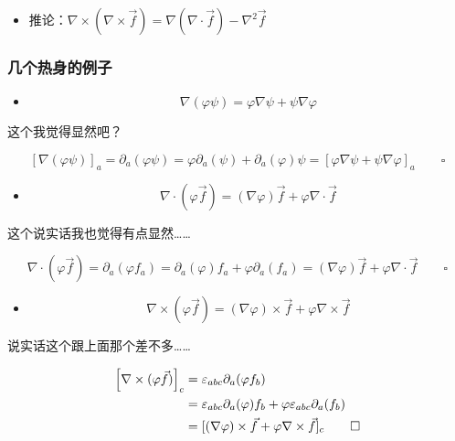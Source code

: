 \documentclass{article}
\begin{document}
\begin{itemize}
    \item 推论：$\nabla\times(\nabla\times\vec{f})=\nabla(\nabla\cdot\vec{f})-\nabla^2\vec{f}$
\end{itemize}

\subsubsection{几个热身的例子}

\begin{itemize}
    \item $$\nabla(\varphi\psi)=\varphi\nabla\psi+\psi\nabla\varphi$$
\end{itemize}

这个我觉得显然吧？

$$[\nabla(\varphi\psi)]_{a}=\partial_{a}(\varphi\psi)=\varphi\partial_{a}(\psi)+\partial_{a}(\varphi)\psi=[\varphi\nabla\psi+\psi\nabla\varphi]_{a}\qquad\square$$

\begin{itemize}
    \item $$\nabla\cdot(\varphi\vec{f})=(\nabla\varphi)\vec{f}+\varphi\nabla\cdot\vec{f}$$
\end{itemize}

这个说实话我也觉得有点显然……

$$\nabla\cdot(\varphi\vec{f})=\partial_{a}(\varphi f_{a})=\partial_{a}(\varphi)f_{a}+\varphi\partial_{a}(f_{a})=(\nabla\varphi)\vec{f}+\varphi\nabla\cdot\vec{f}\qquad\square$$

\begin{itemize}
    \item $$\nabla\times(\varphi\vec{f})=(\nabla\varphi)\times\vec{f}+\varphi\nabla\times\vec{f}$$
\end{itemize}

说实话这个跟上面那个差不多……

$$\begin{aligned}
        \qty[\nabla\times(\varphi\vec{f})]_{c} & =\varepsilon_{abc}\partial_{a}(\varphi f_{b})                                            \\
                                               & =\varepsilon_{abc}\partial_{a}(\varphi)f_{b}+\varphi\varepsilon_{abc}\partial_{a}(f_{b}) \\
                                               & =[(\nabla\varphi)\times\vec{f}+\varphi\nabla\times\vec{f}]_{c}\qquad\square
    \end{aligned}$$
\end{document}
